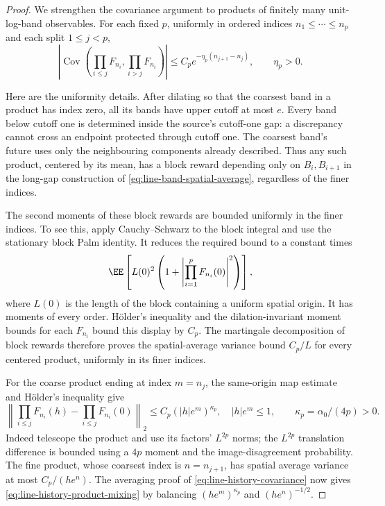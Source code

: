 \documentclass[11pt,letterpaper]{article}
\begin{document}
\begin{proof}
We strengthen the covariance argument to products of finitely many
unit-log-band observables. For each fixed $p$, uniformly in ordered
indices $n_1\le\cdots\le n_p$ and each split $1\le j<p$,
\begin{equation}\label{eq:line-history-product-mixing}
 \left|\operatorname{Cov}\left(
       \prod_{i\le j}F_{n_i},\prod_{i>j}F_{n_i}\right)\right|
       \le C_p e^{-\eta_p(n_{j+1}-n_j)},\qquad \eta_p>0.
\end{equation}

Here are the uniformity details. After dilating so that the coarsest
band in a product has index zero, all its bands have upper cutoff
at most $e$. Every band below cutoff one is determined inside the
source's cutoff-one gap: a discrepancy cannot cross an endpoint
protected through cutoff one. The coarsest band's future uses only
the neighbouring components already described. Thus any such product,
centered by its mean, has a block reward depending only on $B_i,B_{i+1}$
in the long-gap construction of
\eqref{eq:line-band-spatial-average}, regardless of the finer indices.

The second moments of these block rewards are bounded uniformly in
the finer indices. To see this, apply Cauchy--Schwarz to the block
integral and use the stationary block Palm identity. It reduces
the required bound to a constant times
\[
 \EE\left[L(0)^2
              \left(1+\left|\prod_{i=1}^pF_{n_i}(0)\right|^2\right)\right],
\]
where $L(0)$ is the length of the block containing a uniform spatial
origin. It has moments of every order. H\"older's inequality and
the dilation-invariant moment bounds for each $F_{n_i}$ bound this
display by $C_p$. The martingale decomposition of block rewards
therefore proves the spatial-average variance bound $C_p/L$ for
every centered product, uniformly in its finer indices.

For the coarse product ending at index $m=n_j$, the same-origin
map estimate and H\"older's inequality give
\[
 \left\|\prod_{i\le j}F_{n_i}(h)
              -\prod_{i\le j}F_{n_i}(0)\right\|_2
       \le C_p(|h|e^m)^{\kappa_p},
 \quad |h|e^m\le1,\qquad \kappa_p=\alpha_0/(4p)>0.
\]
Indeed telescope the product and use its factors' $L^{2p}$ norms;
the $L^{2p}$ translation difference is bounded using a $4p$ moment
and the image-disagreement probability.
The fine product, whose coarsest index is $n=n_{j+1}$, has spatial
average variance at most $C_p/(he^n)$.
The averaging proof of \eqref{eq:line-history-covariance} now gives
\eqref{eq:line-history-product-mixing} by balancing
$(he^m)^{\kappa_p}$ and $(he^n)^{-1/2}$.


\end{proof}
\end{document}
